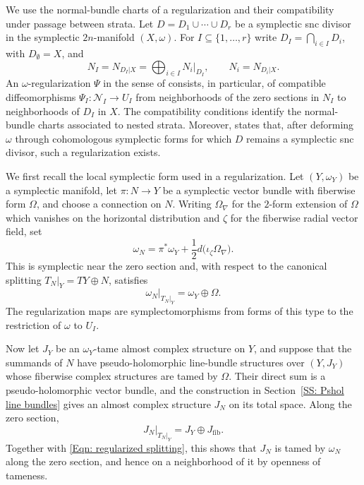 \documentclass[11pt]{amsart}
\numberwithin{equation}{section}
\theoremstyle{plain}
\theoremstyle{definition}
\newcommand{\cN}{\mathcal{N}}
\begin{document}
We use the normal-bundle charts of a regularization and their compatibility
under passage between strata. Let $D=D_1\cup\cdots\cup D_r$ be a symplectic snc
divisor in the symplectic $2n$-manifold $(X,\omega)$. For
$I\subseteq\{1,\ldots,r\}$ write $D_I=\bigcap_{i\in I}D_i$, with
$D_\emptyset=X$, and
\[
N_I=N_{D_I|X}=\bigoplus_{i\in I}N_i|_{D_I},
\qquad N_i=N_{D_i|X}.
\]
An $\omega$-regularization $\Psi$ in the sense of \cite{TMZ1} consists, in
particular, of compatible diffeomorphisms
$\Psi_I:\cN_I\to U_I$ from neighborhoods of the zero sections in $N_I$ to
neighborhoods of $D_I$ in $X$. The compatibility conditions identify the
normal-bundle charts associated to nested strata. Moreover,
\cite[Thm.\,2.13]{TMZ1} states that, after deforming $\omega$ through
cohomologous symplectic forms for which $D$ remains a symplectic snc divisor,
such a regularization exists.

We first recall the local symplectic form used in a regularization. Let
$(Y,\omega_Y)$ be a symplectic manifold, let $\pi:N\to Y$ be a symplectic vector
bundle with fiberwise form $\Omega$, and choose a connection on $N$. Writing
$\Omega_\nabla$ for the $2$-form extension of $\Omega$ which vanishes on the
horizontal distribution and $\zeta$ for the fiberwise radial vector field, set
\begin{equation}
\label{Eqn: regularized symplectic form}
\omega_N=\pi^*\omega_Y+\frac12d\bigl(\iota_\zeta\Omega_\nabla\bigr).
\end{equation}
This is symplectic near the zero section and, with respect to the canonical
splitting $T_N|_Y=TY\oplus N$, satisfies
\begin{equation}
\label{Eqn: regularized splitting}
\omega_N|_{T_N|_Y}=\omega_Y\oplus\Omega.
\end{equation}
The regularization maps are symplectomorphisms from forms of this type to the
restriction of $\omega$ to $U_I$.

Now let $J_Y$ be an $\omega_Y$-tame almost complex structure on $Y$, and
suppose that the summands of $N$ have pseudo-holomorphic line-bundle structures
over $(Y,J_Y)$ whose fiberwise complex structures are tamed by $\Omega$. Their
direct sum is a pseudo-holomorphic vector bundle, and the construction in
Section~\ref{SS: Pshol line bundles} gives an almost complex structure
$J_N$ on its total space. Along the zero section,
\[
J_N|_{T_N|_Y}=J_Y\oplus J_{\mathrm{fib}}.
\]
Together with \eqref{Eqn: regularized splitting}, this shows that $J_N$ is
tamed by $\omega_N$ along the zero section, and hence on a neighborhood of it
by openness of tameness.
\end{document}
